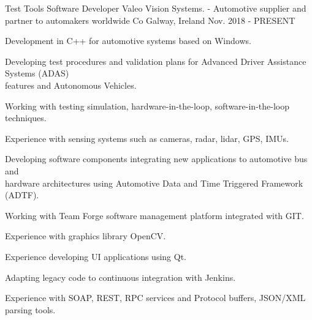 

\begin{cventries}

  \cventry
    {Test Tools Software Developer} %
    {Valeo Vision Systems. - Automotive supplier and partner to automakers worldwide} %
    {Co Galway, Ireland} %
    {Nov. 2018 - PRESENT} %
    {
      \begin{cvitems} %
        \item {Development in C++ for automotive systems based on Windows.}
        \item {Developing test procedures and validation plans for Advanced Driver Assistance Systems (ADAS)\\
    features and Autonomous Vehicles.}
        \item {Working with testing simulation, hardware-in-the-loop, software-in-the-loop techniques.}
        \item {Experience with sensing systems such as cameras, radar, lidar, GPS, IMUs.}
        \item {Developing software components integrating new applications to automotive bus and\\
    hardware architectures using Automotive Data and Time Triggered Framework (ADTF).}
        \item {Working with Team Forge software management platform integrated with GIT.}
        \item {Experience with graphics library OpenCV.}
        \item {Experience developing UI applications using Qt.}
        \item {Adapting legacy code to continuous integration with Jenkins.}
        \item {Experience with SOAP, REST, RPC services and Protocol buffers, JSON/XML parsing tools.}
      \end{cvitems}
    }


\end{cventries}
